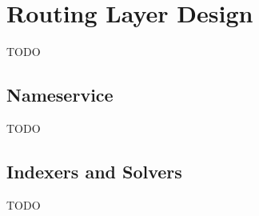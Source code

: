 \section{Routing Layer Design}
TODO

\subsection{Nameservice}
TODO

\subsection{Indexers and Solvers}
TODO
